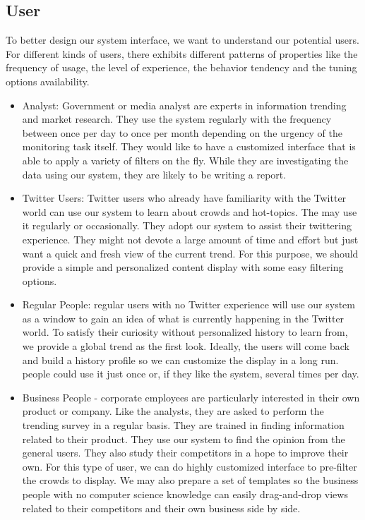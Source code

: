 \documentclass{sig-alternate}
\begin{document}
\subsection{User}
To better design our system interface, we want to understand our potential
users. For different kinds of users, there exhibits different patterns of
properties like the frequency of usage, the level of experience, the behavior
tendency and the tuning options availability.
\begin{itemize}
    \item Analyst: Government or media analyst are experts in information
    trending and market research. They use the system regularly with the
    frequency between once per day to once per month depending on the urgency
    of the monitoring task itself. They would like to have a customized interface
    that is able to apply a variety of filters on the fly. While they are 
    investigating the data using our system, they are likely to be writing a
    report.

    \item Twitter Users: Twitter users who already have familiarity with the
    Twitter world can use our system to learn about crowds
    and hot-topics. The may use it regularly or occasionally. They adopt our
    system to assist their twittering experience. They might not devote a large
    amount of time and effort but just want a quick and fresh view of the
    current trend. For this purpose, we should provide a simple and
    personalized content display with some easy filtering options.

    \item Regular People: regular users with no Twitter experience will use
    our system as a window to gain an idea of what is currently happening
    in the Twitter world. To satisfy their curiosity without personalized
    history to learn from, we provide a global trend as the first look.
    Ideally, the users will come back and build a history profile so we can
    customize the display in a long run. people could use it just once or, if
    they like the system, several times per day.

    \item Business People - corporate employees are particularly interested in
    their own product or company. Like the analysts, they are asked to perform
    the trending survey in a regular basis. They are trained in finding
    information related to their product. They use our system to find the
    opinion from the general users. They also study their competitors in a hope
    to improve their own. For this type of user, we can do highly customized
    interface to pre-filter the crowds to display. We may also prepare a set of
    templates so the business people with no computer science knowledge can
    easily drag-and-drop views related to their competitors and their own
    business side by side.

\end{itemize}
\end{document}
